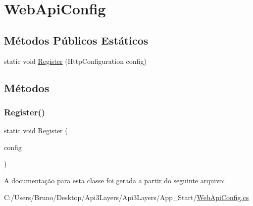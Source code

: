 \hypertarget{classApi3Layers_1_1WebApiConfig}{}\section{Web\+Api\+Config}
\label{classApi3Layers_1_1WebApiConfig}
\subsection*{Métodos Públicos Estáticos}
\begin{DoxyCompactItemize}
\item 
static void \hyperlink{classApi3Layers_1_1WebApiConfig_a8941f9a1c4d63842b463068258264cf4}{Register} (Http\+Configuration config)
\end{DoxyCompactItemize}


\subsection{Métodos}
\mbox{\label{classApi3Layers_1_1WebApiConfig_a8941f9a1c4d63842b463068258264cf4}} 
\subsubsection{\texorpdfstring{Register()}{Register()}}
{\footnotesize\ttfamily static void Register (\begin{DoxyParamCaption}\item[{Http\+Configuration}]{config }\end{DoxyParamCaption})\hspace{0.3cm}{\ttfamily [static]}}



A documentação para esta classe foi gerada a partir do seguinte arquivo\+:\begin{DoxyCompactItemize}
\item 
C\+:/\+Users/\+Bruno/\+Desktop/\+Api3\+Layers/\+Api3\+Layers/\+App\+\_\+\+Start/\hyperlink{WebApiConfig_8cs}{Web\+Api\+Config.\+cs}\end{DoxyCompactItemize}
